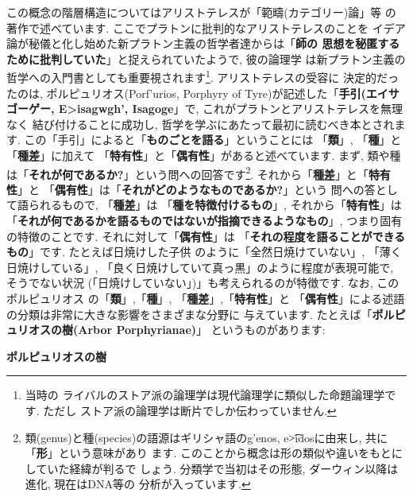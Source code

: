 この概念の階層構造についてはアリストテレスが「範疇(カテゴリー)論」等
の著作で述べています. ここでプラトンに批判的なアリストテレスのことを
イデア論が秘儀と化し始めた新プラトン主義の哲学者達からは「\textbf{師の
思想を秘匿するために批判していた}」と捉えられていたようで, 彼の論理学
は新プラトン主義の哲学への入門書としても重要視されます\footnote{当時の
ライバルのストア派の論理学は現代論理学に類似した命題論理学です. ただし
ストア派の論理学は断片でしか伝わっていません.}. アリストテレスの受容に
決定的だったのは, ポルピュリオス(\textgreek{Porf'urios}, Porphyry of
 Tyre)が記述した「\textbf{手引(エイサゴーゲー, \textgreek{E>isagwgh'},
 Isagoge\cite{Barnes}}」で, これがプラトンとアリストテレスを無理なく
結び付けることに成功し, 哲学を学ぶにあたって最初に読むべき本とされます.
 この「手引」によると「\textbf{ものごとを語る}」ということには
「\textbf{類}」, 「\textbf{種}」と「\textbf{種差}」に加えて
「\textbf{特有性}」と「\textbf{偶有性}」があると述べています. まず,
 類や種は「\textbf{それが何であるか?}」という問への回答です\footnote{
類(genus)と種(species)の語源はギリシャ語の\textgreek{g'enos}, 
 \textgreek{e\t{>i}dos}に由来し, 共に「\textbf{形}」という意味があり
ます. このことから概念は形の類似や違いをもとにしていた経緯が判るで
しょう. 分類学で当初はその形態, ダーウィン以降は進化, 現在はDNA等の
分析が入っています.}. それから「\textbf{種差}」と「\textbf{特有性}」と
「\textbf{偶有性}」は「\textbf{それがどのようなものであるか?}」という
問への答として語られるもので, 「\textbf{種差}」は
「\textbf{種を特徴付けるもの}」, それから「\textbf{特有性}」は
「\textbf{それが何であるかを語るものではないが指摘できるようなもの}」,
 つまり固有の特徴のことです. それに対して「\textbf{偶有性}」は
「\textbf{それの程度を語ることができるもの}」です. たとえば日焼けした子供
のように「全然日焼けていない」, 「薄く日焼けしている」, 
「良く日焼けしていて真っ黒」のように程度が表現可能で, そうでない状況
(「日焼けしていない」)」も考えられるのが特徴です. なお, このポルピュリオス
の「\textbf{類}」,「\textbf{種}」, 「\textbf{種差}」,「\textbf{特有性}」と
「\textbf{偶有性}」による述語の分類は非常に大きな影響をさまざまな分野に
与えています. たとえば「\textbf{ポルピュリオスの樹(Arbor Porphyrianae)}」
というものがあります:


\begin{itembox}[c]{\textbf{ポルピュリオスの樹}}
{\tiny
{}
}
\end{itembox}

